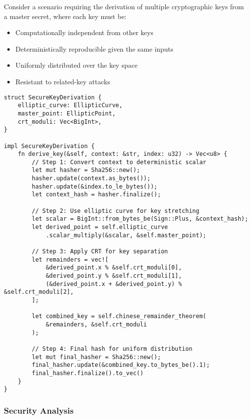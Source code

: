 \documentclass[12pt,a4paper]{article}
\begin{document}
Consider a scenario requiring the derivation of multiple cryptographic keys from a master secret, where each key must be:

\begin{itemize}
    \item Computationally independent from other keys
    \item Deterministically reproducible given the same inputs
    \item Uniformly distributed over the key space
    \item Resistant to related-key attacks
\end{itemize}

\begin{lstlisting}[caption={Secure Key Derivation System Implementation}]
struct SecureKeyDerivation {
    elliptic_curve: EllipticCurve,
    master_point: EllipticPoint,
    crt_moduli: Vec<BigInt>,
}

impl SecureKeyDerivation {
    fn derive_key(&self, context: &str, index: u32) -> Vec<u8> {
        // Step 1: Convert context to deterministic scalar
        let mut hasher = Sha256::new();
        hasher.update(context.as_bytes());
        hasher.update(&index.to_le_bytes());
        let context_hash = hasher.finalize();
        
        // Step 2: Use elliptic curve for key stretching
        let scalar = BigInt::from_bytes_be(Sign::Plus, &context_hash);
        let derived_point = self.elliptic_curve
            .scalar_multiply(&scalar, &self.master_point);
        
        // Step 3: Apply CRT for key separation
        let remainders = vec![
            &derived_point.x % &self.crt_moduli[0],
            &derived_point.y % &self.crt_moduli[1],
            (&derived_point.x + &derived_point.y) % &self.crt_moduli[2],
        ];
        
        let combined_key = self.chinese_remainder_theorem(
            &remainders, &self.crt_moduli
        );
        
        // Step 4: Final hash for uniform distribution
        let mut final_hasher = Sha256::new();
        final_hasher.update(&combined_key.to_bytes_be().1);
        final_hasher.finalize().to_vec()
    }
}
\end{lstlisting}

\subsubsection{Security Analysis}
\end{document}
